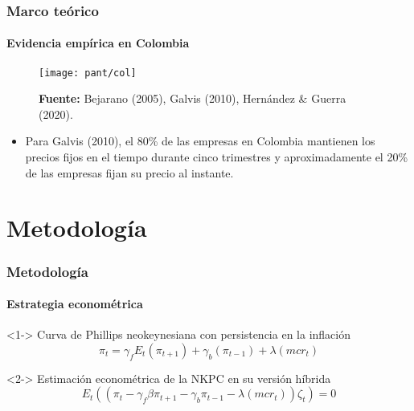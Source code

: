 \documentclass[10pt]{beamer}
\begin{document}


\begin{frame}
\frametitle{Marco teórico}
\framesubtitle{Evidencia empírica en Colombia}
\begin{figure}
\texttt{[image: pant/col]}
\centering
\label{fig:ejemplo}\\
  \raggedright  \tiny \textbf{Fuente:} Bejarano (2005)\dag, Galvis (2010)\dag\dag, Hernández \& Guerra (2020)\dag\dag\dag.
\end{figure}
\begin{itemize}
\justifying
\item Para Galvis (2010), el 80\% de las empresas en Colombia mantienen los precios fijos en el tiempo durante cinco trimestres y aproximadamente el 20\% de las empresas fijan su precio al instante.
\end{itemize}
\end{frame}

\section{Metodología}
\begin{frame}
\frametitle{Metodología}
\framesubtitle{Estrategia econométrica}
\begin{alertblock}<1-> {Curva de Phillips neokeynesiana con persistencia en la inflación}
\begin{equation*}
\pi_{t}= \gamma_{f}E_{t}(\pi_{t+1})+\gamma_{b}(\pi_{t-1})+\lambda(mcr_{t})
\end{equation*}
\end{alertblock}

\begin{alertblock}<2-> {Estimación econométrica de la NKPC en su versión híbrida}
\begin{equation*}
E_{t}((\pi_{t}-\gamma_{f}\beta  \pi_{t+1}-\gamma_{b}\pi_{t-1}-\lambda(mcr_{t}))\zeta_{t})=0
\end{equation*}
\end{alertblock}

\end{frame}
 
\end{document}
